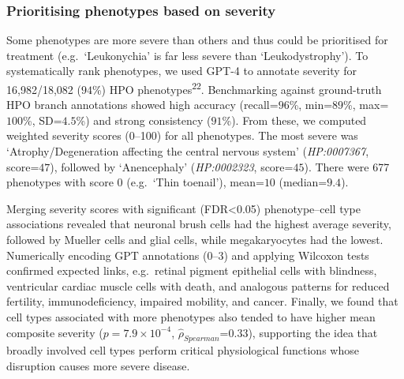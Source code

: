 \documentclass[
]{article}
\begin{document}
\subsubsection{Prioritising phenotypes based on
severity}\label{prioritising-phenotypes-based-on-severity-1}

Some phenotypes are more severe than others and thus could be
prioritised for treatment (e.g.~`Leukonychia' is far less severe than
`Leukodystrophy'). To systematically rank phenotypes, we used GPT-4 to
annotate severity for 16,982/18,082 (\(94\)\%) HPO
phenotypes\textsuperscript{22}. Benchmarking against ground-truth HPO
branch annotations showed high accuracy (recall=\(96\)\%, min=\(89\)\%,
max=\(100\)\%, SD=\(4.5\)\%) and strong consistency (\(91\)\%). From
these, we computed weighted severity scores (0--100) for all phenotypes.
The most severe was `Atrophy/Degeneration affecting the central nervous
system' (\emph{HP:0007367}, score=\(47\)), followed by `Anencephaly'
(\emph{HP:0002323}, score=\(45\)). There were 677 phenotypes with score
0 (e.g.~`Thin toenail'), mean=\(10\) (median=\(9.4\)).

Merging severity scores with significant (FDR\textless0.05)
phenotype--cell type associations revealed that neuronal brush cells had
the highest average severity, followed by Mueller cells and glial cells,
while megakaryocytes had the lowest. Numerically encoding GPT
annotations (0--3) and applying Wilcoxon tests confirmed expected links,
e.g.~retinal pigment epithelial cells with blindness, ventricular
cardiac muscle cells with death, and analogous patterns for reduced
fertility, immunodeficiency, impaired mobility, and cancer. Finally, we
found that cell types associated with more phenotypes also tended to
have higher mean composite severity (\(p=\)\(7.9 \times 10^{-4}\),
\(\hat{\rho}_{Spearman}\)=\(0.33\)), supporting the idea that broadly
involved cell types perform critical physiological functions whose
disruption causes more severe disease.
\end{document}
